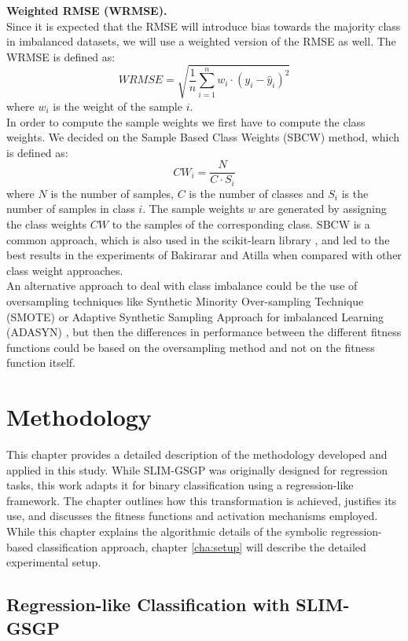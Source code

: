 \documentclass[manuscript, review, anonymous]{acmart} %
\begin{document}
\textbf{Weighted RMSE (WRMSE).}\\ 
Since it is expected that the RMSE will introduce bias
towards the majority class in imbalanced datasets,
we will use a weighted version of the RMSE as
well.
The WRMSE is defined as:
\[
WRMSE = \sqrt{\frac{1}{n} \sum_{i=1}^{n} w_i \cdot (y_i - \hat{y}_i)^2}\]
where \(w_i\) is the weight of the sample \(i\).\\
In order to compute the sample weights we first have
to compute the class weights. We decided on the Sample Based Class Weights (SBCW)
method, which is defined as:
\[
CW_i = \frac{N}{C \cdot S_i}\]
where \(N\) is the number of samples, \(C\) is the
number of classes and \(S_i\) is the number of samples
in class \(i\).
The sample weights $w$ are generated by assigning the class
weights $CW$ to the samples of the corresponding class.
SBCW is a common approach, which is also used in
the scikit-learn library \cite{sklearn},
and led to the best results in the experiments of Bakirarar and Atilla \cite{BAKIRARAR2023} when compared with other class weight approaches.\\
An alternative approach to deal with class imbalance could be
the use of oversampling techniques like
Synthetic Minority Over-sampling Technique (SMOTE) \cite{smote} 
or Adaptive Synthetic Sampling Approach for imbalanced Learning (ADASYN) \cite{adasyn},
but then the differences in performance between the different fitness
functions could be based on the oversampling method and
not on the fitness function itself.



\section{Methodology}
\label{cha:methodology}
This chapter provides a detailed description of the methodology developed and applied in this study. 
While SLIM-GSGP was originally designed for regression tasks, this work adapts it for binary classification using a regression-like framework. 
The chapter outlines how this transformation is achieved, justifies its use, and discusses the fitness functions and activation mechanisms employed. 
While this chapter explains the algorithmic details of the symbolic regression-based classification approach,
chapter \ref{cha:setup} will describe the detailed experimental setup.
\subsection{Regression-like Classification with SLIM-GSGP}
\end{document}
